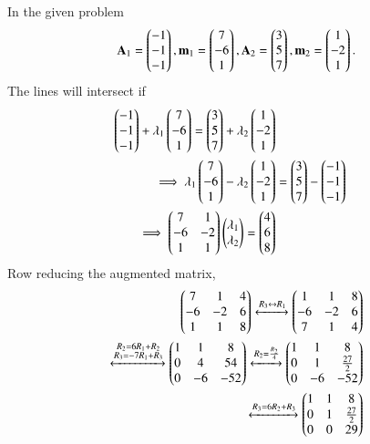 
In the given  problem
\begin{align}
\mathbf{A}_1= \begin{pmatrix}-1\\-1\\-1\end{pmatrix}, \mathbf{m}_1=\begin{pmatrix}7 \\ -6 \\1\end{pmatrix},
\mathbf{A}_2= \begin{pmatrix}3\\5\\7\end{pmatrix}, \mathbf{m}_2 =\begin{pmatrix}1 \\ -2 \\1\end{pmatrix}.
\end{align}
The lines will intersect if
\begin{align}
\begin{pmatrix}-1\\-1\\-1\end{pmatrix} + \lambda_1\begin{pmatrix}7 \\ -6 \\1\end{pmatrix}
= \begin{pmatrix}3\\5\\7\end{pmatrix} + \lambda_2\begin{pmatrix}1 \\ -2 \\1\end{pmatrix}
\\
\implies \lambda_1\begin{pmatrix}7 \\ -6 \\1\end{pmatrix} - \lambda_2\begin{pmatrix}1 \\ -2 \\1\end{pmatrix} &= \begin{pmatrix}3\\5\\7\end{pmatrix}-\begin{pmatrix}-1\\-1\\-1\end{pmatrix}  
\\
\implies \begin{pmatrix}7 & 1 \\ -6 & -2 \\ 1 & 1\end{pmatrix}\begin{pmatrix}\lambda_1\\ \lambda_2\end{pmatrix} = \begin{pmatrix}4\\6\\8\end{pmatrix}\label{sep/2/22/condition}
\end{align}
Row reducing the augmented matrix,
\begin{align}
\begin{pmatrix}
7 & 1 & 4 
\\
-6 & -2 & 6
\\
1 & 1 & 8
\end{pmatrix}
\xleftrightarrow[]{R_3\leftrightarrow R_1}
\begin{pmatrix}
1 & 1 & 8
\\
-6 & -2 & 6
\\
7 & 1 & 4
\end{pmatrix}
\\
\xleftrightarrow[]{\substack{R_2= 6R_1+R_2\\R_3 = -7R_1+R_3}}
\begin{pmatrix}
1 & 1 & 8
\\
0 & 4 & 54
\\
0 & -6 & -52
\end{pmatrix}
\xleftrightarrow[]{R_2= \frac{R_2}{4}}
\begin{pmatrix}
1 & 1 & 8
\\
0 & 1 & \frac{27}{2}
\\
0 & -6 & -52
\end{pmatrix}
\\
\xleftrightarrow[]{R_3=6R_2+R_3}
\begin{pmatrix}
1 & 1 & 8
\\
0 & 1 & \frac{27}{2}
\\
0 & 0 & 29
\end{pmatrix}
\end{align}
